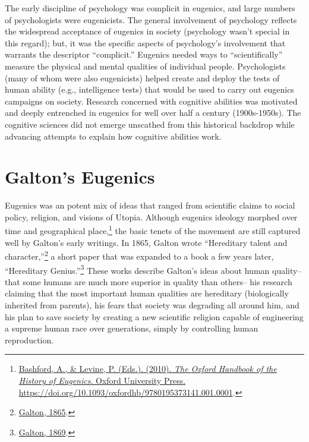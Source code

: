 \documentclass[
  oneside,
  12pt]{crumpbook}
\begin{document}
The early discipline of psychology was complicit in eugenics, and large numbers of psychologists were eugenicists. The general involvement of psychology reflects the widespread acceptance of eugenics in society (psychology wasn't special in this regard); but, it was the specific aspects of psychology's involvement that warrants the descriptor ``complicit.'' Eugenics needed ways to ``scientifically'' measure the physical and mental qualities of individual people. Psychologists (many of whom were also eugenicists) helped create and deploy the tests of human ability (e.g., intelligence tests) that would be used to carry out eugenics campaigns on society. Research concerned with cognitive abilities was motivated and deeply entrenched in eugenics for well over half a century (1900s-1950s). The cognitive sciences did not emerge unscathed from this historical backdrop while advancing attempts to explain how cognitive abilities work.

\hypertarget{galtons-eugenics}{%
\section{Galton's Eugenics}\label{galtons-eugenics}}

Eugenics was an potent mix of ideas that ranged from scientific claims to social policy, religion, and visions of Utopia. Although eugenics ideology morphed over time and geographical place,\footnote{\protect\hyperlink{ref-bashfordOxfordHandbookHistory2010}{Bashford, A., \& Levine, P. (Eds.). (2010). \emph{The {Oxford Handbook} of the {History} of {Eugenics}}. {Oxford University Press}. \url{https://doi.org/10.1093/oxfordhb/9780195373141.001.0001}}.} the basic tenets of the movement are still captured well by Galton's early writings. In 1865, Galton wrote ``Hereditary talent and character,''\footnote{\protect\hyperlink{ref-galtonHereditaryTalentCharacter1865}{Galton, 1865}.} a short paper that was expanded to a book a few years later, ``Hereditary Genius.''\footnote{\protect\hyperlink{ref-galtonHereditaryGenius1869}{Galton, 1869}.} These works describe Galton's ideas about human quality-- that some humans are much more superior in quality than others-- his research claiming that the most important human qualities are hereditary (biologically inherited from parents), his fears that society was degrading all around him, and his plan to save society by creating a new scientific religion capable of engineering a supreme human race over generations, simply by controlling human reproduction.
\end{document}
